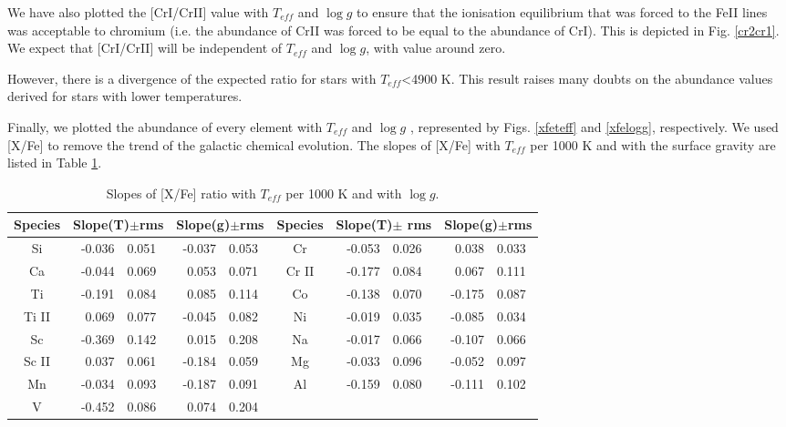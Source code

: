 \documentclass[dvips,12pt,a4paper]{report}
\begin{document}
{{We have also plotted the [CrI/CrII] value with $T_{eff}$ and $\log g$ to ensure that the ionisation equilibrium that was forced to the FeII lines \citep{Santos-2000b} was acceptable to chromium (i.e. the abundance of CrII was forced to be equal to the abundance of CrI). This is depicted in Fig. \ref{cr2cr1}. We expect that [CrI/CrII]  will be independent of $T_{eff}$ and $\log g$, with value around zero. 

However, there is a divergence of the expected ratio for stars with $T_{eff}$<4900 K. This result raises many doubts on the abundance values derived for stars with lower temperatures.

Finally, we plotted the abundance of every element with $T_{eff}$ and $\log g$ , represented by Figs. \ref{xfeteff} and  \ref{xfelogg}, respectively. We used [X/Fe] to remove the trend of the galactic chemical evolution. The slopes of [X/Fe] with $T_{eff}$ per 1000 K and with the surface gravity are listed in Table \ref{slopes}.

\begin{table}[h]
\label {slopes}\scriptsize
\centering
\caption[Slopes of metallicity in function of $T{eff}$ per 1000 K ]{Slopes of [X/Fe] ratio with $T_{eff}$ per 1000 K and with $\log g$.} 
\begin{tabular}{ c r@{$\pm$}l r@{$\pm$}l | c r@{$\pm$}l r@{$\pm$}l}

\hline
\hline 
Species & \multicolumn {2}{c}{Slope(T)$\pm$rms} & \multicolumn {2}{c}{Slope(g)$\pm$rms} & Species & \multicolumn {2}{c}{Slope(T)$\pm$ rms} & \multicolumn {2}{c}{Slope(g)$\pm$rms} \\
\hline
Si & -0.036 & 0.051 & -0.037	& 0.053 & Cr & -0.053 &   0.026 & 0.038 & 0.033 \\
Ca &  -0.044 &    0.069 & 0.053 & 0.071 & Cr II &  -0.177 & 0.084 & 0.067 & 0.111 \\
Ti & -0.191 & 0.084 & 0.085	& 0.114 & Co & -0.138 &  0.070 & -0.175 & 0.087 \\ 
Ti II &  0.069 & 0.077 & -0.045 & 0.082 &  Ni & -0.019 & 0.035 & -0.085 & 0.034 \\
Sc & -0.369 & 0.142 & 0.015 & 0.208	& Na &-0.017 &   0.066 & -0.107 & 0.066 \\
Sc II &  0.037 & 0.061 & -0.184 & 0.059 & Mg & -0.033 & 0.096& -0.052 & 0.097 \\
Mn & -0.034  &  0.093  & -0.187 & 0.091 &  Al & -0.159  &    0.080 & -0.111 & 0.102 \\
V & -0.452 & 0.086 & 0.074 & 0.204 \\
\hline


\end{tabular}
\end{table}}}
\end{document}
